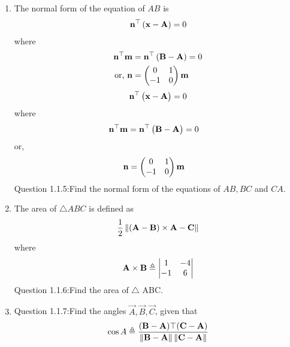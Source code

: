 \begin{enumerate}[label=\thesection.\arabic*.,ref=\thesection.\theenumi]
\item The normal form of the equation of $AB$  is 
		\begin{align}
			\mathbf{n}^{\top}\left(	\mathbf{x}-\mathbf{A}\right) = 0
		\end{align}
		where 
		\begin{align}
			\mathbf{n}^{\top}\mathbf{m}&=\mathbf{n}^{\top}\left(\mathbf{B}-\mathbf{A}\right) = 0
			\\
			\text{or, } \mathbf{n}&=\begin{pmatrix}0 & 1 \\ -1 & 0\end{pmatrix} \mathbf{m}
		\end{align}
  \begin{align}
\mathbf{n}^{\top}\begin{pmatrix}\mathbf{x}-\mathbf{A}\end{pmatrix}=0
\end{align}
where
\begin{align}
\mathbf{n}^{\top}\mathbf{m}&=\mathbf{n}^{\top}\begin{pmatrix}\mathbf{B}-\mathbf{A}\end{pmatrix}=0
\end{align}	
or,\begin{align}
\mathbf{n}&=\begin{pmatrix}0 &1 \\-1 & 0\end{pmatrix}\mathbf{m}
\end{align}
Question 1.1.5:Find the normal form of the equations of $AB, BC$ and $CA$.\\



\item The area of $\triangle ABC$ is defined as
		\begin{align}
			\frac{1}{2}\left\lVert{\ensuremath{\left(\mathbf{A}-\mathbf{B}\right)}\times {\mathbf{A}-\mathbf{C}}}\right\rVert
		\end{align}
		where
		\begin{align}
			\mathbf{A}\times\mathbf{B} \triangleq \begin{vmatrix}1 & -4 \\-1 & 6\end{vmatrix}
		\end{align}
Question 1.1.6:Find the area of $\triangle$ ABC.\\




\item
Question 1.1.7:Find the angles $\vec{A},\vec{B},\vec{C}$, given that 
\begin{align}
	\cos{A} \triangleq \frac{(\mathbf{B}-\mathbf{A})\top(\mathbf{C}-\mathbf{A})}{\left\lVert\mathbf{B}-\mathbf{A}\right\rVert\left\lVert\mathbf{C}-\mathbf{A}\right\rVert}
\end{align}


\end{enumerate}
